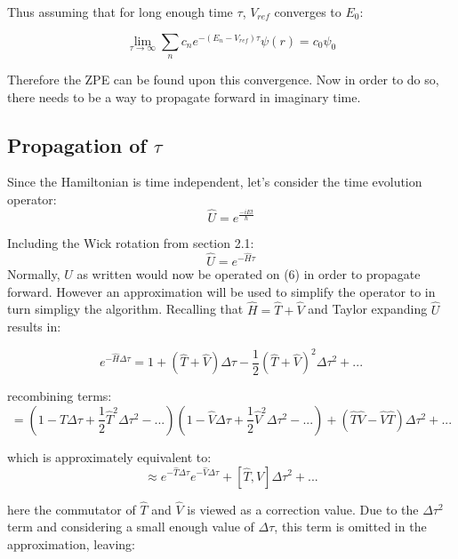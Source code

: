 \documentclass{article}
\begin{document}
Thus assuming that for long enough time $\tau$, $V_{ref}$ converges to $E_{0}$:

\begin{equation} \label{eqn}
\lim_{\tau\to\infty}\sum_{n}c_{n}e^{-(E_{n}-V_{ref})\tau}\psi(r) = c_{0}\psi_{0}
\end{equation}

Therefore the ZPE can be found upon this convergence.
Now in order to do so, there needs to be a way to propagate forward in imaginary time. 

\subsection{Propagation of $\tau$}
Since the Hamiltonian is time independent, let's consider the time evolution operator:
\begin{equation} \label{eqn}
\hat{U}=e^{\frac{-iEt}{\hbar}}
\end{equation}

Including the Wick rotation from section 2.1:
\begin{equation} \label{eqn}
\hat{U}=e^{-\hat{H}\tau}
\end{equation}
Normally, $\hat{U}$ as written would now be operated on (6) in order to propagate forward. However an approximation will be used to simplify the operator to in turn simpligy the algorithm. Recalling that $\hat{H}=\hat{T}+\hat{V}$ and Taylor expanding $\hat{U}$ results in:

\begin{equation} \label{eqn}
e^{-\hat{H}\Delta\tau}=1+(\hat{T}+\hat{V})\Delta\tau-\frac{1}{2}(\hat{T}+\hat{V})^2\Delta\tau^2+...
\end{equation}

recombining terms:
\begin{equation} \label{eqn}
=(1-\hat{T}\Delta\tau+\frac{1}{2}\hat{T}^2\Delta\tau^2-...)(1-\hat{V}\Delta\tau+\frac{1}{2}\hat{V}^2\Delta\tau^2-...)+(\hat{T}\hat{V}-\hat{V}\hat{T})\Delta\tau^2+...
\end{equation}

which is approximately equivalent to: 
\begin{equation} \label{eqn}
\approx{e^{-\hat{T}\Delta\tau}e^{-\hat{V}\Delta\tau}+[\hat{T},\hat{V}]\Delta\tau^2+...}
\end{equation}

here the commutator of $\hat{T}$ and $\hat{V}$ is viewed as a correction value. Due to the $\Delta\tau^2$ term and considering a small enough value of $\Delta\tau$, this term is omitted in the approximation, leaving:
\end{document}
